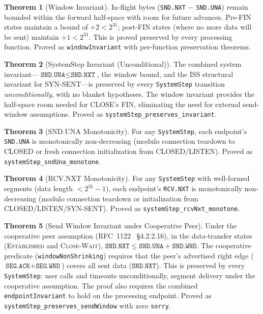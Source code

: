 \documentclass[11pt]{article}
\theoremstyle{definition}
\newtheorem{theorem}{Theorem}[section]
\begin{document}
\begin{theorem}[Window Invariant]
In-flight bytes (\texttt{SND.NXT} $-$ \texttt{SND.UNA}) remain bounded within
the forward half-space with room for future advances. Pre-FIN states maintain
a bound of $+2 < 2^{31}$; post-FIN states (where no more data will be sent)
maintain $+1 < 2^{31}$. This is proved preserved by every processing function.
Proved as \texttt{windowInvariant} with per-function preservation theorems.
\end{theorem}

\begin{theorem}[SystemStep Invariant (Unconditional)]
The combined system invariant---$\texttt{SND.UNA} \leq \texttt{SND.NXT}$,
the window bound, and the ISS structural invariant for SYN-SENT---is preserved
by every \texttt{SystemStep} transition \emph{unconditionally}, with no
blanket hypotheses. The window invariant provides the half-space room needed
for CLOSE's FIN, eliminating the need for external send-window assumptions.
Proved as \texttt{systemStep\_preserves\_invariant}.
\end{theorem}

\begin{theorem}[SND.UNA Monotonicity]
For any \texttt{SystemStep}, each endpoint's \texttt{SND.UNA} is monotonically
non-decreasing (modulo connection teardown to CLOSED or fresh connection
initialization from CLOSED/LISTEN).
Proved as \texttt{systemStep\_sndUna\_monotone}.
\end{theorem}

\begin{theorem}[RCV.NXT Monotonicity]
For any \texttt{SystemStep} with well-formed segments (data length
$< 2^{31} - 1$), each endpoint's \texttt{RCV.NXT} is monotonically
non-decreasing (modulo connection teardown or initialization from
CLOSED/LISTEN/SYN-SENT).
Proved as \texttt{systemStep\_rcvNxt\_monotone}.
\end{theorem}

\begin{theorem}[Send Window Invariant under Cooperative Peer]
Under the cooperative peer assumption (RFC~1122~\cite{rfc1122} \S4.2.2.16), in the
data-transfer states (\textsc{Established} and \textsc{Close-Wait}),
$\texttt{SND.NXT} \leq \texttt{SND.UNA} + \texttt{SND.WND}$. The cooperative
predicate (\texttt{windowNonShrinking}) requires that the peer's advertised
right edge ($\texttt{SEG.ACK} + \texttt{SEG.WND}$) covers all sent data
($\texttt{SND.NXT}$). This is preserved by every \texttt{SystemStep}: user
calls and timeouts unconditionally, segment delivery under the cooperative
assumption. The proof also requires the combined \texttt{endpointInvariant}
to hold on the processing endpoint.
Proved as \texttt{systemStep\_preserves\_sendWindow} with zero \texttt{sorry}.
\end{theorem}
\end{document}
